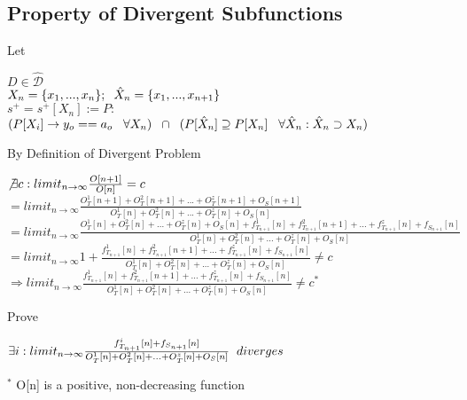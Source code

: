 \documentclass[11pt]{article}
\begin{document}
\subsection{Property of Divergent Subfunctions}
Let
\begin{center}
$
D \in \hat{\mathcal{D}}
$
\\ \vspace{6mm}
$
X_n = \{x_1,...,x_n\}; \hspace{2mm} \hat{X}_n = \{x_1,...,x_{n+1}\}
$
\\ \vspace{6mm}
$
s^+ = s^+[X_n] := P :
$
\\ \vspace{2mm}
$
(P \lbrack X_i \rbrack \rightarrow y_{o} == a_{o} \hspace{3mm} \forall X_n) \hspace{2mm} \cap \hspace{2mm} (P[\hat{X}_n] \supseteq P[X_n] \hspace{3mm} \forall \hat{X}_n : \hat{X}_n \supset X_n)
$
\vspace{4mm}
\end{center}
By Definition of Divergent Problem
\begin{center}
\vspace{2mm}
$
\not \exists c : limit_{n \rightarrow \infty} \frac{O[n+1]}{O[n]} = c
$
\\ \vspace{2mm}
$
= limit_{n \rightarrow \infty} \frac{O^1_T[n+1] + O^2_T[n+1] + ... + O^z_T[n+1] + O_S[n+1]}{O^1_T[n] + O^2_T[n] + ... + O^z_T[n] + O_S[n]}
$
\\ \vspace{4mm}
$
= limit_{n \rightarrow \infty} \frac{O^1_T[n] + O^2_T[n] + ... + O^z_T[n] + O_S[n] + f^1_{T_{n+1}}[n] + f^2_{T_{n+1}}[n+1] + ... + f^z_{T_{n+1}}[n] + f_{S_{n+1}}[n]}{O^1_T[n] + O^2_T[n] + ... + O^z_T[n] + O_S[n]}
$
\\ \vspace{4mm}
$
= limit_{n \rightarrow \infty} 1 + \frac{f^1_{T_{n+1}}[n] + f^2_{T_{n+1}}[n+1] + ... + f^z_{T_{n+1}}[n] + f_{S_{n+1}}[n]}{O^1_T[n] + O^2_T[n] + ... + O^z_T[n] + O_S[n]} \neq c
$
\\ \vspace{4mm}
$
\Rightarrow limit_{n \rightarrow \infty} \frac{f^1_{T_{n+1}}[n] + f^2_{T_{n+1}}[n+1] + ... + f^z_{T_{n+1}}[n] + f_{S_{n+1}}[n]}{O^1_T[n] + O^2_T[n] + ... + O^z_T[n] + O_S[n]} \neq c^*
$
\end{center}
Prove
\begin{center}
\vspace{3mm}
$
\exists i :  limit_{n \rightarrow \infty} \frac{f^i_{T_{n+1}}[n] + f_{S_{n+1}}[n]}{O^1_T[n] + O^2_T[n] + ... + O^z_T[n] + O_S[n]} \hspace{2mm} diverges
$
\end{center}
$^*$ O[n] is a positive, non-decreasing function
\end{document}
